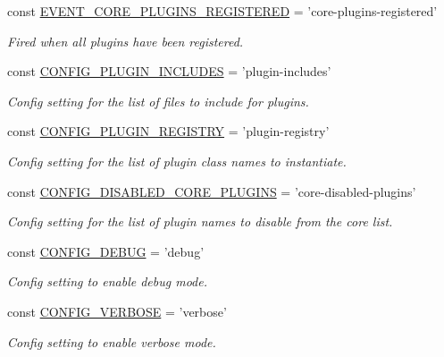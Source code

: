 \begin{DoxyCompactItemize}
const \hyperlink{group__events_ga41dac3001e87d8cd46c49e942e3b171c}{E\-V\-E\-N\-T\-\_\-\-C\-O\-R\-E\-\_\-\-P\-L\-U\-G\-I\-N\-S\-\_\-\-R\-E\-G\-I\-S\-T\-E\-R\-E\-D} = 'core-\/plugins-\/registered'
\begin{DoxyCompactList}\small\item\em Fired when all plugins have been registered. \end{DoxyCompactList}\item 
const \hyperlink{group__config_ga6a85183e9c9f8aaa564fe3ab89f5c155}{C\-O\-N\-F\-I\-G\-\_\-\-P\-L\-U\-G\-I\-N\-\_\-\-I\-N\-C\-L\-U\-D\-E\-S} = 'plugin-\/includes'
\begin{DoxyCompactList}\small\item\em Config setting for the list of files to include for plugins. \end{DoxyCompactList}\item 
const \hyperlink{group__config_gac9a4a3df52ecff6e3489e2834c8d6464}{C\-O\-N\-F\-I\-G\-\_\-\-P\-L\-U\-G\-I\-N\-\_\-\-R\-E\-G\-I\-S\-T\-R\-Y} = 'plugin-\/registry'
\begin{DoxyCompactList}\small\item\em Config setting for the list of plugin class names to instantiate. \end{DoxyCompactList}\item 
const \hyperlink{group__config_gabc38296098bf02b2418bd83602e56edc}{C\-O\-N\-F\-I\-G\-\_\-\-D\-I\-S\-A\-B\-L\-E\-D\-\_\-\-C\-O\-R\-E\-\_\-\-P\-L\-U\-G\-I\-N\-S} = 'core-\/disabled-\/plugins'
\begin{DoxyCompactList}\small\item\em Config setting for the list of plugin names to disable from the core list. \end{DoxyCompactList}\item 
const \hyperlink{group__config_ga45d0602aad6bc9cbe04270b059d48bcd}{C\-O\-N\-F\-I\-G\-\_\-\-D\-E\-B\-U\-G} = 'debug'
\begin{DoxyCompactList}\small\item\em Config setting to enable debug mode. \end{DoxyCompactList}\item 
const \hyperlink{group__config_gad09ed47ac67500b2ba6cc4a88d667a67}{C\-O\-N\-F\-I\-G\-\_\-\-V\-E\-R\-B\-O\-S\-E} = 'verbose'
\begin{DoxyCompactList}\small\item\em Config setting to enable verbose mode. \end{DoxyCompactList}\item 

\end{DoxyCompactItemize}
